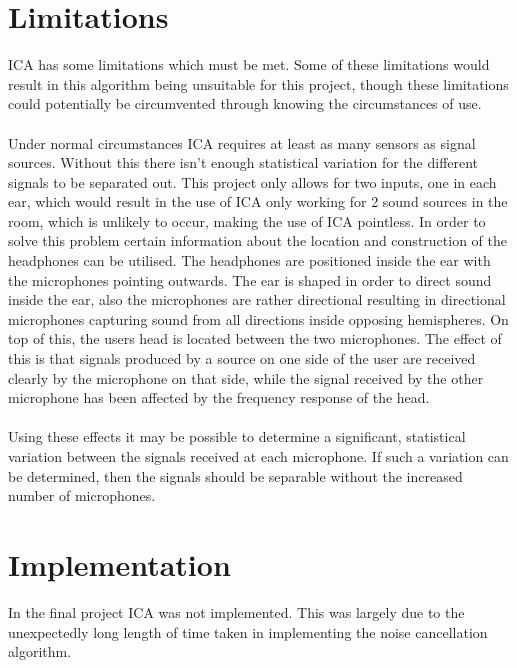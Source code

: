 \section{Limitations}
ICA has some limitations which must be met.
Some of these limitations would result in this algorithm being unsuitable for this project, though these limitations could potentially be circumvented through knowing the circumstances of use.
\\
\\
Under normal circumstances ICA requires at least as many sensors as signal sources.
Without this there isn't enough statistical variation for the different signals to be separated out.
This project only allows for two inputs, one in each ear, which would result in the use of ICA only working for 2 sound sources in the room, which is unlikely to occur, making the use of ICA pointless.
In order to solve this problem certain information about the location and construction of the headphones can be utilised.
The headphones are positioned inside the ear with the microphones pointing outwards.
The ear is shaped in order to direct sound inside the ear, also the microphones are rather directional resulting in directional microphones capturing sound from all directions inside opposing hemispheres.
On top of this, the users head is located between the two microphones.
The effect of this is that signals produced by a source on one side of the user are received clearly by the microphone on that side, while the signal received by the other microphone has been affected by the frequency response of the head.
\\
\\
Using these effects it may be possible to determine a significant, statistical variation between the signals received at each microphone.
If such a variation can be determined, then the signals should be separable without the increased number of microphones.

\section{Implementation}
In the final project ICA was not implemented.
This was largely due to the unexpectedly long length of time taken in implementing the noise cancellation algorithm.
